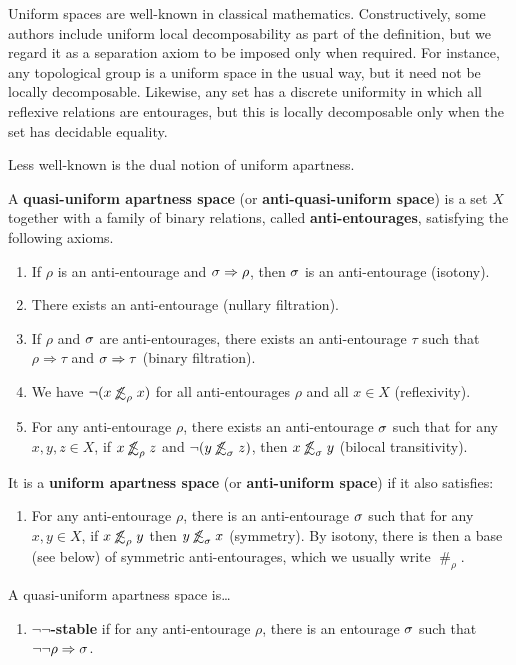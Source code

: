 \documentclass{article}
\def\apart{\mathrel{\#}}
\def\oapt{\mathrel{\!\not\,\not\lesssim}}
\let\implies\Rightarrow
\def\nn{\ensuremath{\neg\neg}}
\begin{document}
Uniform spaces are well-known in classical mathematics.
Constructively, some authors include uniform local decomposability as part of the definition, but we regard it as a separation axiom to be imposed only when required.
For instance, any topological group is a uniform space in the usual way, but it need not be locally decomposable.
Likewise, any set has a discrete uniformity in which all reflexive relations are entourages, but this is locally decomposable only when the set has decidable equality.

Less well-known is the dual notion of uniform apartness.

\begin{defn}
  A \textbf{quasi-uniform apartness space} (or \textbf{anti-quasi-uniform space}) is a set $X$ together with a family of binary relations, called \textbf{anti-entourages}, satisfying the following axioms.
  \begin{enumerate}
  \item If $\rho$ is an anti-entourage and $\si\implies\rho$, then $\sigma$ is an anti-entourage (isotony).
  \item There exists an anti-entourage (nullary filtration).
  \item If $\rho$ and $\sigma$ are anti-entourages, there exists an anti-entourage $\tau$ such that $\rho\implies\tau$ and $\si\implies\tau$ (binary filtration).
  \item We have $\neg(x\oapt_\rho x)$ for all anti-entourages $\rho$ and all $x\in X$ (reflexivity).
  \item For any anti-entourage $\rho$, there exists an anti-entourage $\sigma$ such that for any $x,y,z\in X$, if $x\oapt_\rho z$ and $\neg(y\oapt_\si z)$, then $x\oapt_\si y$ (bilocal transitivity).
  \end{enumerate}
  It is a \textbf{uniform apartness space} (or \textbf{anti-uniform space}) if it also satisfies:
  \begin{enumerate}[resume]
  \item For any anti-entourage $\rho$, there is an anti-entourage $\sigma$ such that for any $x,y\in X$, if $x\oapt_\rho y$ then $y\oapt_\si x$ (symmetry).
    By isotony, there is then a base (see below) of symmetric anti-entourages, which we usually write $\apart_\rho$.
  \end{enumerate}
  A quasi-uniform apartness space is\dots
  \begin{enumerate}[resume]
  \item \textbf{\nn-stable} if for any anti-entourage $\rho$, there is an entourage $\sigma$ such that $\neg\neg\rho \implies \si$. %

\end{enumerate}
\end{defn}
\end{document}
